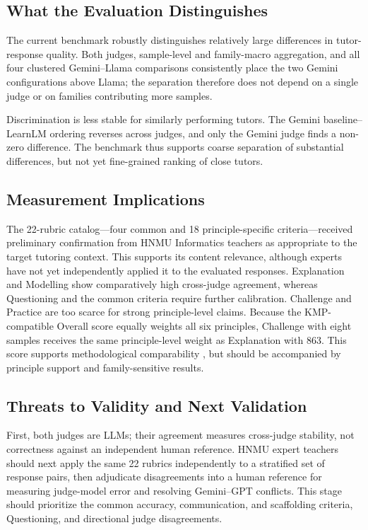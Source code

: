 \documentclass[conference]{IEEEtran}
\begin{document}
\subsection{What the Evaluation Distinguishes}

The current benchmark robustly distinguishes relatively large differences in
tutor-response quality. Both judges, sample-level and family-macro aggregation,
and all four clustered Gemini--Llama comparisons consistently place the two
Gemini configurations above Llama; the separation therefore does not depend on
a single judge or on families contributing more samples.

Discrimination is less stable for similarly performing tutors. The Gemini
baseline--LearnLM ordering reverses across judges, and only the Gemini judge
finds a non-zero difference. The benchmark thus supports coarse separation of
substantial differences, but not yet fine-grained ranking of close tutors.

\subsection{Measurement Implications}

The 22-rubric catalog---four common and 18 principle-specific criteria---received
preliminary confirmation from HNMU Informatics teachers as appropriate to the
target tutoring context. This supports its content relevance, although experts
have not yet independently applied it to the evaluated responses. Explanation
and Modelling show comparatively high cross-judge agreement, whereas
Questioning and the common criteria require further calibration. Challenge and
Practice are too scarce for strong principle-level claims. Because the
KMP-compatible Overall score equally weights all six principles, Challenge
with eight samples receives the same principle-level weight as Explanation
with 863. This score supports methodological comparability
\cite{shi2026kmpbench}, but should be accompanied by principle support and
family-sensitive results.

\subsection{Threats to Validity and Next Validation}

First, both judges are LLMs; their agreement measures cross-judge stability,
not correctness against an independent human reference. HNMU expert teachers
should next apply the same 22 rubrics independently to a stratified set of
response pairs, then adjudicate disagreements into a human reference for
measuring judge-model error and resolving Gemini--GPT conflicts. This stage
should prioritize the common accuracy, communication, and scaffolding criteria,
Questioning, and directional judge disagreements.
\end{document}
